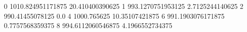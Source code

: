 0 1010.824951171875 20.410400390625
1 993.1270751953125 2.7125244140625
2 990.41455078125 0.0
4 1000.765625 10.35107421875
6 991.1903076171875 0.7757568359375
8 994.6112060546875 4.1966552734375
